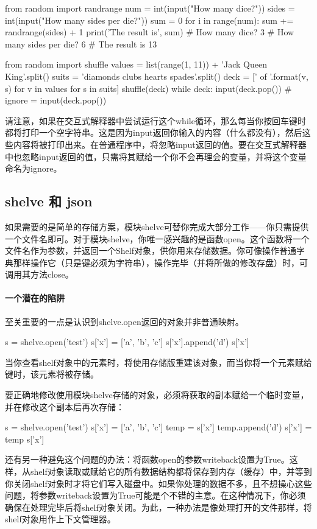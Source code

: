 \begin{tcolorbox}[title=询问用户要掷多少个骰子、每个骰子有多少面]
\begin{pyc}
from random import randrange
num = int(input("How many dice?"))
sides = int(input("How many sides per die?"))
sum = 0
for i in range(num):
    sum += randrange(sides) + 1
print('The result is', sum)
# How many dice? 3
# How many sides per die? 6
# The result is 13
\end{pyc}
\end{tcolorbox}

\begin{tcolorbox}[title=用户每次按回车键时都给他发一张牌]
\begin{pyc}
from random import shuffle
values = list(range(1, 11)) + 'Jack Queen King'.split()
suits = 'diamonds clubs hearts spades'.split()
deck = ['{} of {}'.format(v, s) for v in values for s in suits]
shuffle(deck)
while deck:
    input(deck.pop())
    # ignore = input(deck.pop())
\end{pyc}
请注意，如果在交互式解释器中尝试运行这个while循环，那么每当你按回车键时都将打印一个空字符串。这是因为input返回你输入的内容（什么都没有），然后这些内容将被打印出来。在普通程序中，将忽略input返回的值。要在交互式解释器中也忽略input返回的值，只需将其赋给一个你不会再理会的变量，并将这个变量命名为ignore。
\end{tcolorbox}
\subsection{shelve 和 json}
如果需要的是简单的存储方案，模块shelve可替你完成大部分工作——你只需提供一个文件名即可。对于模块shelve，你唯一感兴趣的是函数open。这个函数将一个文件名作为参数，并返回一个Shelf对象，供你用来存储数据。你可像操作普通字典那样操作它（只是键必须为字符串），操作完毕（并将所做的修改存盘）时，可调用其方法close。

\paragraph{一个潜在的陷阱} 至关重要的一点是认识到shelve.open返回的对象并非普通映射。
\begin{pyc}
s = shelve.open('test')
s['x'] = ['a', 'b', 'c']
s['x'].append('d')
s['x']
\end{pyc}
当你查看shelf对象中的元素时，将使用存储版重建该对象，而当你将一个元素赋给键时，该元素将被存储。

要正确地修改使用模块shelve存储的对象，必须将获取的副本赋给一个临时变量，并在修改这个副本后再次存储：
\begin{pyc}
s = shelve.open('test')
s['x'] = ['a', 'b', 'c']
temp = s['x']
temp.append('d')
s['x'] = temp
s['x']
\end{pyc}
还有另一种避免这个问题的办法：将函数open的参数writeback设置为True。这样，从shelf对象读取或赋给它的所有数据结构都将保存到内存（缓存）中，并等到你关闭shelf对象时才将它们写入磁盘中。如果你处理的数据不多，且不想操心这些问题，将参数writeback设置为True可能是个不错的主意。在这种情况下，你必须确保在处理完毕后将shelf对象关闭。为此，一种办法是像处理打开的文件那样，将shelf对象用作上下文管理器。

